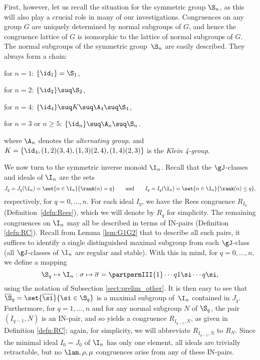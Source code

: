 First, however, let us recall the situation for the symmetric group $\S_n$, as this will also play a crucial role in many of our investigations.
Congruences on any group $G$ are uniquely determined by normal subgroups of $G$, 
and hence the congruence lattice of $G$ is isomorphic to the lattice of normal subgroups of $G$.  
The normal subgroups of the symmetric group~$\S_n$ are easily described.  They
always form a chain:
\begin{itemize}\begin{multicols}{2}
\item for $n=1$: $\{\id_1\}=\S_1$,
\item for $n=2$: $\{\id_2\}\suq\S_2$,
\item for $n=4$: $\{\id_4\}\suq K\suq\A_4\suq\S_4$,
\item for $n=3$ or $n\geq5$: $\{\id_n\}\suq\A_n\suq\S_n$.
\end{multicols}\end{itemize}
where $\A_n$ denotes the \emph{alternating group}, and
$K=\{\id_4,(1,2)(3,4),(1,3)(2,4),(1,4)(2,3)\}$ is the \emph{Klein 4-group}.



We now turn to the symmetric inverse monoid $\I_n$.
Recall that the $\gJ$-classes and ideals of $\I_n$ are the sets
\[
J_q=J_q(\I_n)=\set{\alpha\in\I_n}{\rank(\alpha)=q} \qquad\text{and}\qquad I_q=I_q(\I_n)=\set{\alpha\in\I_n}{\rank(\alpha)\leq q}, 
\]
respectively, for $q=0,\ldots,n$.
For each ideal $I_q$, we have the Rees congruence $R_{I_q}$ (Definition~\ref{defn:Rees}), which we will denote by $R_q$ for simplicity.
%
The remaining congruences on $\I_n$ may all be described in terms of IN-pairs (Definition \ref{defn:RC}).  Recall from Lemma \ref{lem:G1G2} that to describe all such pairs, it suffices to identify a single distinguished maximal subgroup from each $\gJ$-class (all $\gJ$-classes of $\I_n$ are regular and stable).  With this in mind, for $q=0,\dots,n$, we define a mapping
\[
\S_q\mapsto \I_n:\sigma\mapsto\overline{\sigma}=\partpermIII{1}\cdots{q}{{1\si}}\cdots{{q\si}},
\]
using the notation of Subsection \ref{sect:prelim_other}.
It is then easy to see that $\overline{\S}_q=\set{\overline\si}{\si\in\S_q}$ is a maximal subgroup of~$\I_n$ contained in $J_q$.
Furthermore, for $q=1,\ldots,n$ and for any normal subgroup $N$ of $\S_q$, the pair $(I_{q-1},\overline N)$ is an IN-pair, and so yields a congruence $R_{I_{q-1},\overline N}$, as given in Definition \ref{defn:RC}; again, for simplicity, we will abbreviate $R_{I_{q-1},\overline N}$ to $R_N$.  Since the minimal ideal $I_0=J_0$ of $\I_n$ has only one element, all ideals are trivially retractable, but no $\lam,\rho,\mu$ congruences arise from any of these IN-pairs.

